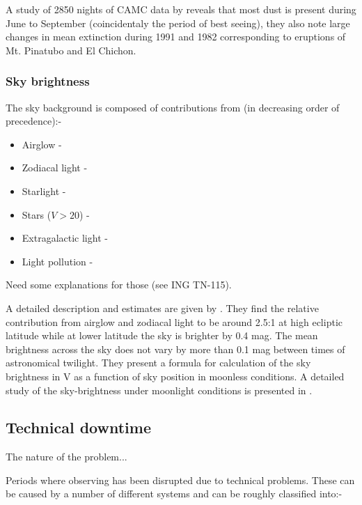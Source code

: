A study of 2850 nights of CAMC data by \cite{guerrero98diurnal} reveals that most dust is present during June to September (coincidentaly the period of best seeing), they also note large changes in mean extinction during 1991 and 1982 corresponding to eruptions of Mt. Pinatubo and El Chichon.

\subsubsection{Sky brightness}
The sky background is composed of contributions from (in decreasing order of precedence):-
\begin{itemize}
\item Airglow - 
\item Zodiacal light -
\item Starlight -
\item Stars ($V > 20$) -
\item Extragalactic light -
\item Light pollution -
\end{itemize}
Need some explanations for those (see ING TN-115).

A detailed description and estimates are given by \cite{lapalma115}. They find the relative contribution from airglow and zodiacal light to be around 2.5:1 at high ecliptic latitude while at lower latitude the sky is brighter by 0.4 mag. The mean brightness across the sky does not vary by more than 0.1 mag between times of astronomical twilight. They present a formula for calculation of the sky brightness in V as a function of sky position in moonless conditions. A detailed study of the sky-brightness under moonlight conditions is presented in \cite{krisciunas91brightness}. 



\subsection{Technical downtime}
The nature of the problem...

Periods where observing has been disrupted due to technical problems. These can be caused by a number of different systems and can be roughly classified into:-

